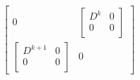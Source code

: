 \begin{dmath}\label{eqn:threeSpringLoopattemptII:660}
\begin{bmatrix}
0 
&
\begin{bmatrix}
D^k & 0 \\
0 &   0 \\
\end{bmatrix} 
\\
\begin{bmatrix}
D^{k+1} & 0 \\
0 &   0 \\
\end{bmatrix} 
&
0  
\end{bmatrix}

\end{dmath}
